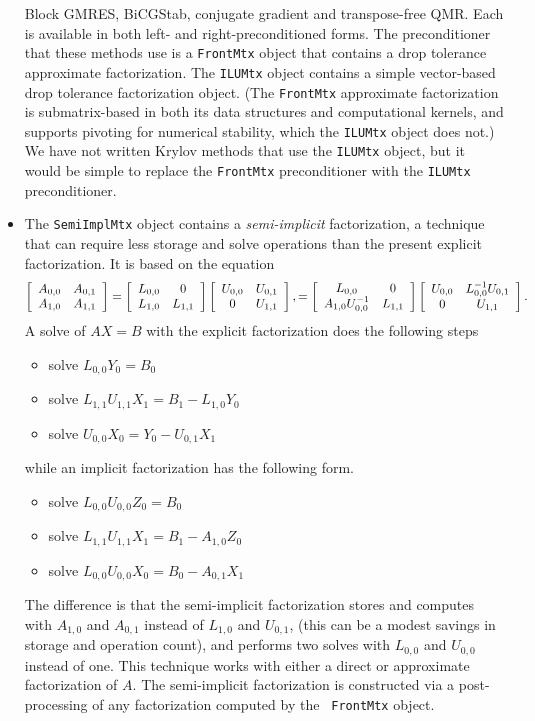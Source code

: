 \begin{itemize}
Block GMRES, BiCGStab, conjugate gradient and transpose-free QMR.
Each is available in both left- and right-preconditioned forms.
The preconditioner that these methods use is a {\tt FrontMtx}
object that contains a drop tolerance approximate factorization.
The {\tt ILUMtx} object contains a simple vector-based drop
tolerance factorization object.
(The {\tt FrontMtx} approximate factorization is submatrix-based in
both its data structures and computational kernels, and supports
pivoting for numerical stability, which the {\tt ILUMtx} object
does not.)
We have not written Krylov methods that use the {\tt ILUMtx}
object, but it would be simple to replace the {\tt FrontMtx}
preconditioner with the {\tt ILUMtx} preconditioner.
\item
The {\tt SemiImplMtx} object contains
a {\it semi-implicit} factorization, 
a technique that can require less storage and solve operations than
the present explicit factorization. It is based on the equation
$$
\left \lbrack \begin{array}{cc}
A_{0,0} & A_{0,1} \cr
A_{1,0} & A_{1,1} 
\end{array} \right \rbrack
=
\left \lbrack \begin{array}{cc}
L_{0,0} & 0 \cr
L_{1,0} & L_{1,1} 
\end{array} \right \rbrack
\left \lbrack \begin{array}{cc}
U_{0,0} & U_{0,1} \cr
 0 & U_{1,1} 
\end{array} \right \rbrack,
=
\left \lbrack \begin{array}{cc}
L_{0,0} & 0 \cr
A_{1,0}U_{0,0}^{-1} & L_{1,1} 
\end{array} \right \rbrack
\left \lbrack \begin{array}{cc}
U_{0,0} & L_{0,0}^{-1}U_{0,1} \cr
 0 & U_{1,1}
\end{array} \right \rbrack.
$$
A solve of $AX = B$ 
with the explicit factorization does the following steps
\begin{itemize}
\item solve $L_{0,0} Y_0 = B_0$
\item solve $L_{1,1} U_{1,1} X_1 = B_1 - L_{1,0} Y_0$
\item solve $U_{0,0} X_0 = Y_0 - U_{0,1} X_1$
\end{itemize}
while an implicit factorization has the following form.
\begin{itemize}
\item solve $L_{0,0} U_{0,0} Z_0 = B_0$
\item solve $L_{1,1} U_{1,1} X_1 = B_1 - A_{1,0} Z_0$
\item solve $L_{0,0} U_{0,0} X_0 = B_0 - A_{0,1} X_1$
\end{itemize}
The difference is that the semi-implicit factorization stores
and computes with 
$A_{1,0}$ and $A_{0,1}$ instead of $L_{1,0}$ and $U_{0,1}$,
(this can be a modest savings in storage and operation count),
and performs two solves with $L_{0,0}$ and $U_{0,0}$
instead of one.
This technique works with either a direct or approximate
factorization of $A$.
The semi-implicit factorization is constructed via a
post-processing of any factorization computed by the {\tt
FrontMtx} object.
\end{itemize}
